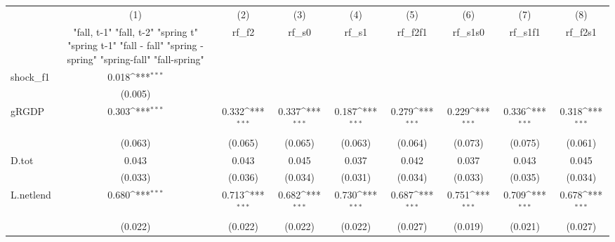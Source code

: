 {
\def\sym#1{\ifmmode^{#1}\else\(^{#1}\)\fi}
\begin{tabular}{l*{8}{c}}
\toprule
            &\multicolumn{1}{c}{(1)}&\multicolumn{1}{c}{(2)}&\multicolumn{1}{c}{(3)}&\multicolumn{1}{c}{(4)}&\multicolumn{1}{c}{(5)}&\multicolumn{1}{c}{(6)}&\multicolumn{1}{c}{(7)}&\multicolumn{1}{c}{(8)}\\
            &\multicolumn{1}{c}{  "fall, t-1" "fall, t-2" "spring t" "spring t-1"  "fall - fall" "spring - spring" "spring-fall" "fall-spring" }&\multicolumn{1}{c}{rf\_f2}&\multicolumn{1}{c}{rf\_s0}&\multicolumn{1}{c}{rf\_s1}&\multicolumn{1}{c}{rf\_f2f1}&\multicolumn{1}{c}{rf\_s1s0}&\multicolumn{1}{c}{rf\_s1f1}&\multicolumn{1}{c}{rf\_f2s1}\\
\midrule
shock\_f1    &       0.018\sym{***}&                     &                     &                     &                     &                     &                     &                     \\
            &     (0.005)         &                     &                     &                     &                     &                     &                     &                     \\
\addlinespace
gRGDP       &       0.303\sym{***}&       0.332\sym{***}&       0.337\sym{***}&       0.187\sym{***}&       0.279\sym{***}&       0.229\sym{***}&       0.336\sym{***}&       0.318\sym{***}\\
            &     (0.063)         &     (0.065)         &     (0.065)         &     (0.063)         &     (0.064)         &     (0.073)         &     (0.075)         &     (0.061)         \\
\addlinespace
D.tot       &       0.043         &       0.043         &       0.045         &       0.037         &       0.042         &       0.037         &       0.043         &       0.045         \\
            &     (0.033)         &     (0.036)         &     (0.034)         &     (0.031)         &     (0.034)         &     (0.033)         &     (0.035)         &     (0.034)         \\
\addlinespace
L.netlend   &       0.680\sym{***}&       0.713\sym{***}&       0.682\sym{***}&       0.730\sym{***}&       0.687\sym{***}&       0.751\sym{***}&       0.709\sym{***}&       0.678\sym{***}\\
            &     (0.022)         &     (0.022)         &     (0.022)         &     (0.022)         &     (0.027)         &     (0.019)         &     (0.021)         &     (0.027)         \\

\end{tabular}}
